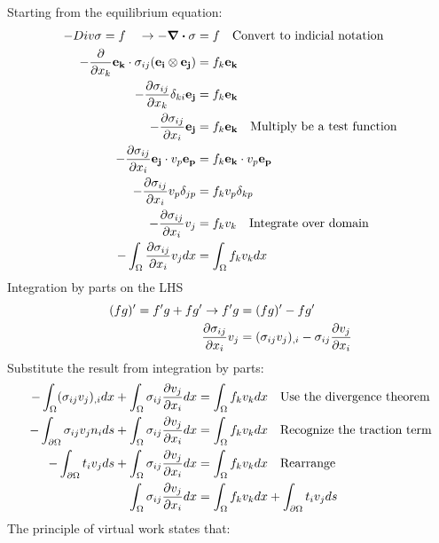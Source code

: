 \documentclass[12pt,3p]{article}
\numberwithin{equation}{section}
\begin{document}
Starting from the equilibrium equation: 
\begin{align*}
\begin{split}
- Div \sigma = f \quad \rightarrow - \div \sigma &= f \quad \text{Convert to indicial notation} \\
	- \pdv{}{x_k} \mathbf{e_k} \cdot \sigma_{ij} (\mathbf{e_i} \otimes \mathbf{e_j}) &= f_k \mathbf{e_k} \\
	- \pdv{\sigma_{ij}}{x_k} \delta_{ki} \mathbf{e_j} &= f_k \mathbf{e_k} \\
	- \pdv{\sigma_{ij}}{x_i} \mathbf{e_j} &= f_k \mathbf{e_k} \quad \text{Multiply be a test function} \\
	- \pdv{\sigma_{ij}}{x_i} \mathbf{e_j} \cdot v_p \mathbf{e_p} &= f_k \mathbf{e_k} \cdot v_p \mathbf{e_p} \\
	- \pdv{\sigma_{ij}}{x_i} v_p \delta_{jp} &= f_k v_p \delta_{kp} \\
			 - \pdv{\sigma_{ij}}{x_i} v_j &= f_k v_k \quad \text{Integrate over domain} \\
			 - \int_{\Omega} \pdv{\sigma_{ij}}{x_i} v_j dx &= \int_{\Omega} f_k v_k dx \\
\end{split}
\end{align*}
Integration by parts on the LHS 
\begin{align*}
(fg)' = f'g + fg' \rightarrow f'g &= (fg)' - fg' \\
\pdv{\sigma_{ij}}{x_i} v_j &= (\sigma_{ij} v_j)_{,i} - \sigma_{ij} \pdv{v_j}{x_i} 
\end{align*}
Substitute the result from integration by parts: 
\begin{align*}
\begin{split}
- \int_{\Omega} (\sigma_{ij} v_j)_{,i} dx + \int_{\Omega} \sigma_{ij} \pdv{v_j}{x_i} dx &= \int_{\Omega} f_k v_k dx \quad \text{Use the divergence theorem} \\ 
- \int_{\partial \Omega} \sigma_{ij} v_j n_i ds + \int_{\Omega} \sigma_{ij} \pdv{v_j}{x_i} dx &= \int_{\Omega} f_k v_k dx \quad \text{Recognize the traction term} \\
- \int_{\partial \Omega} t_i v_j ds + \int_{\Omega} \sigma_{ij} \pdv{v_j}{x_i} dx &= \int_{\Omega} f_k v_k dx \quad \text{Rearrange} \\
 \int_{\Omega} \sigma_{ij} \pdv{v_j}{x_i} dx &= \int_{\Omega} f_k v_k dx + \int_{\partial \Omega} t_i v_j ds
\end{split}
\end{align*}
The principle of virtual work states that:
\end{document}
